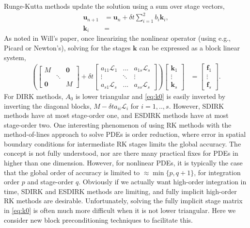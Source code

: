 \documentclass[a4paper,10pt]{article}
\begin{document}
Runge-Kutta methods update the solution using a sum over stage vectors,
%
\begin{align*}
\mathbf{u}_{n+1} & = \mathbf{u}_n + \delta t \sum_{i=1}^2 b_i\mathbf{k}_i, \\
\mathbf{k}_i & = 
\end{align*}
%
As noted in Will's paper, once linearizing the nonlinear operator (using e.g., Picard or Newton's),
solving for the stages $\mathbf{k}$ can be expressed as a block linear system,
%
\begin{align}\label{eq:k0}
\left( \begin{bmatrix} M  & & \mathbf{0} \\ & \ddots \\ \mathbf{0} & & M\end{bmatrix}
	+ \delta t \begin{bmatrix} a_{11}\mathcal{L}_1 & ... & a_{1s}\mathcal{L}_s \\
	\vdots & \ddots & \vdots \\ a_{s1}\mathcal{L}_s & ... & a_{ss} \mathcal{L}_s \end{bmatrix} \right)
	\begin{bmatrix} \mathbf{k}_1 \\ \vdots \\ \mathbf{k}_s \end{bmatrix} 
& = \begin{bmatrix} \mathbf{f}_1 \\ \vdots \\ \mathbf{f}_s \end{bmatrix}.
\end{align}
%
For DIRK methods, $A_0$ is lower triangular and \eqref{eq:k0} is easily inverted by inverting
the diagonal blocks, $M - \delta ta_{ii}\mathcal{L}_i$ for $i=1,..,s$. However, SDIRK methods
have at most stage-order one, and ESDIRK methods have at most stage-order two. One
interesting phenomenon of using RK methods with the method-of-lines approach to solve PDEs
is order reduction, where error in spatial boundary conditions for intermediate RK stages limits the
global accuracy. The concept is not fully understood, nor are there many practical fixes for PDEs
in higher than one dimension. However, for nonlinear PDEs, it is typically the case that the global 
order of accuracy is limited to $\approx \min\{ p, q+1\}$, for integration order $p$ and stage-order
$q$. Obviously if we actually want high-order integration in time, SDIRK and ESDIRK methods
are limiting, and fully implicit high-order RK methods are desirable. Unfortunately, solving the
fully implicit stage matrix in \eqref{eq:k0} is often much more difficult when it is not lower triangular.
Here we consider new block preconditioning techniques to facilitate this.
\end{document}
